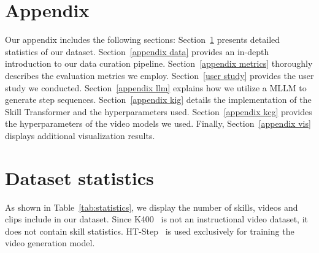 
\newtheorem{sketch_definition}{Definition}[section]
\section*{Appendix}
\appendix


Our appendix includes the following sections: Section~\ref{appendix stat} presents detailed statistics of our dataset. Section~\ref{appendix data} provides an in-depth introduction to our data curation pipeline. Section~\ref{appendix metrics} thoroughly describes the evaluation metrics we employ. Section~\ref{user study} provides the user study we conducted. Section~\ref{appendix llm} explains how we utilize a MLLM to generate step sequences. Section~\ref{appendix kig} details the implementation of the Skill Transformer and the hyperparameters used. Section~\ref{appendix kcg} provides the hyperparameters of the video models we used. Finally, Section~\ref{appendix vis} displays additional visualization results.

\section{Dataset statistics}
\label{appendix stat}
As shown in Table~\ref{tab:statistics}, we display the number of skills, videos and clips include in our dataset. Since K400~\cite{k400} is not an instructional video dataset, it does not contain skill statistics. HT-Step~\cite{htstep} is used exclusively for training the video generation model.

\begin{table}[h]
\centering
{}
\caption{The statistics of our dataset including COIN, CrossTask, HT-Step and K400.}
\label{tab:statistics}
\end{table}

